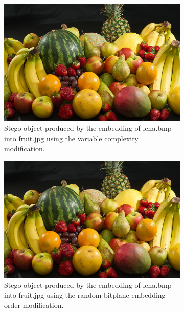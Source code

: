\documentclass{l4proj}
\begin{document}
\begin{figure}[]
    \centering
    \begin{subfigure}[b]{0.3\textwidth}
        \includegraphics[width=\textwidth]{images/improved_stego_variable_grayincolour.png}
        \caption{Stego object produced by the embedding of lena.bmp into fruit.jpg using the variable complexity modification.}
        \label{fig:variable_grayincolour}
    \end{subfigure}
    \begin{subfigure}[b]{0.3\textwidth}
        \includegraphics[width=\textwidth]{images/improved_stego_rbeo_grayincolour.png}
        \caption{Stego object produced by the embedding of lena.bmp into fruit.jpg using the random bitplane embedding order modification.}
        \label{fig:rbeo_grayincolour}
    \end{subfigure}
    \begin{subfigure}[b]{0.3\textwidth}

\end{subfigure}
\end{figure}
\end{document}

